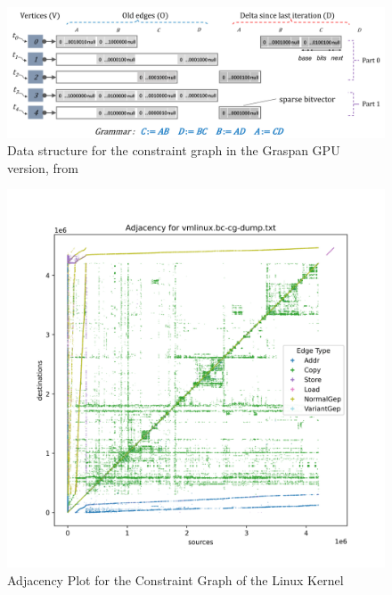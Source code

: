 \begin{figure}
    \centering
    \includegraphics[width=1.\textwidth]{img/graspan-g.png}
    \caption[Graspan GPU Data Structure for the Constraint Graph]{Data structure for the constraint graph in the Graspan GPU version, from \cite{zuo2021systemizing}}
    \label{fig:graspan-g}
\end{figure}

\begin{figure}
    \centering
    \includegraphics[width=1.\textwidth]{img/linux-consg-min.png}
    \caption{Adjacency Plot for the Constraint Graph of the Linux Kernel}
    \label{fig:linux-consg}
\end{figure}


